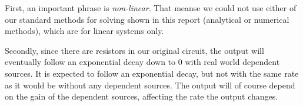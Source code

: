 \documentclass[10pt, AMS Euler]{article}
\begin{document}
First, an important phrase is \textit{non-linear}. That meanse we could not use either of our standard methods for solving shown in this report (analytical or numerical methods), which are for linear systems only. 

Secondly, since there are resistors in our original circuit, the output will eventually follow an exponential decay down to 0 with real world dependent sources. It is expected to follow an exponential decay, but not with the same rate as it would be without any dependent sources. The output will of course depend on the gain of the dependent sources, affecting the rate the output changes. 





\noindent \underline{\hspace{7in}}\\
\end{document}
